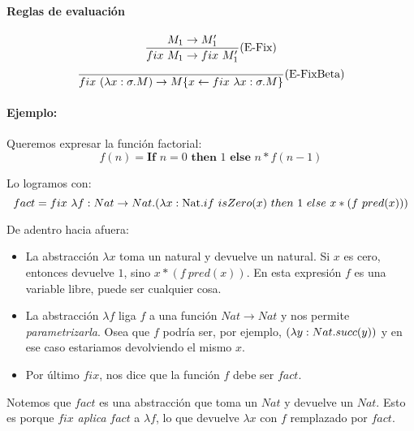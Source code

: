 \paragraph{Reglas de evaluación}
\begin{equation*}
	\frac{M_1\to M'_1}{fix~M_1\to fix~M'_1}(\text{E-Fix})
\end{equation*}
\vspace*{5mm}
\begin{equation*}
	\frac{}{fix~(\lambda x: \sigma . M)\to M\{x\leftarrow fix~\lambda x: \sigma . M\}}(\text{E-FixBeta})
\end{equation*}

\paragraph{Ejemplo:} Queremos expresar la función factorial:
$$f(n) = \textbf{If } n=0 \textbf{ then } 1 \textbf{ else } n*f(n-1)$$

Lo logramos con:
$$fact = fix~\lambda f: Nat\rightarrow Nat . (\lambda x: \text{Nat} . if~ isZero(x)~ then~ 1~ else~ x*(f~pred(x)))$$

De adentro hacia afuera:
\begin{itemize}
	\item La abstracción $\lambda x$ toma un natural y devuelve un natural. Si $x$ es cero, entonces devuelve $1$, sino $x*(f~pred(x))$. En esta expresión $f$ es una variable libre, puede ser cualquier cosa.
	\item La abstracción $\lambda f$ liga $f$ a una función $Nat\to Nat$ y nos permite \textit{parametrizarla}. Osea que $f$ podría ser, por ejemplo, $(\lambda y: Nat . succ(y))$ y en ese caso estariamos devolviendo el mismo $x$.
	\item Por último $fix$, nos dice que la función $f$ debe ser $fact$.
\end{itemize}

Notemos que $fact$ es una abstracción que toma un $Nat$ y devuelve un $Nat$. Esto es porque $fix$ \textit{aplica} $fact$ a $\lambda f$, lo que devuelve $\lambda x$ con $f$ remplazado por $fact$.